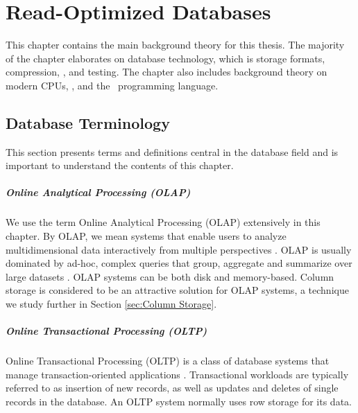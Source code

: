 \chapter{Read-Optimized Databases}
\label{chap:olap}

This chapter contains the main background theory for this thesis. The majority of the chapter elaborates on database technology, which is storage formats, compression, \bi, and testing. The chapter also includes background theory on modern CPUs, \mde, and the \delphi~programming language. 

\clearpage

\section{Database Terminology}
\label{sec:Database Terminology}
This section presents terms and definitions central in the database field and is important to understand the contents of this chapter.

\paragraph{Online Analytical Processing (OLAP)}
\label{par:Online Analytical Processing (OLAP)}
  We use the term Online Analytical Processing (OLAP) extensively in this chapter. By OLAP, we mean systems that enable users to analyze multidimensional data interactively from multiple perspectives \cite{Wikipedia_contributors2015-hw}. OLAP is usually dominated by ad-hoc, complex queries that group, aggregate and summarize over large datasets \cite{Bjorklund2011-wh}. OLAP systems can be both disk and memory-based. Column storage is considered to be an attractive solution for OLAP systems, a technique we study further in Section \ref{sec:Column Storage}.


\paragraph{Online Transactional Processing (OLTP)}
\label{par:Online Transactional Processing (OLTP)}
Online Transactional Processing (OLTP) is a class of database systems that manage transaction-oriented applications \cite{Wikipedia_contributors2015-cw}. Transactional workloads are typically referred to as insertion of new records, as well as updates and deletes of single records in the database. An OLTP system normally uses row storage for its data.

